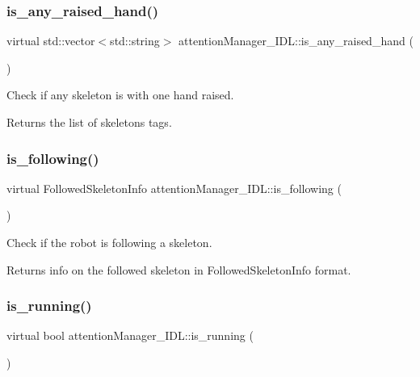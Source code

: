 \subsubsection{\texorpdfstring{is\+\_\+any\+\_\+raised\+\_\+hand()}{is\_any\_raised\_hand()}}
{\footnotesize\ttfamily virtual std\+::vector$<$std\+::string$>$ attention\+Manager\+\_\+\+I\+D\+L\+::is\+\_\+any\+\_\+raised\+\_\+hand (\begin{DoxyParamCaption}{ }\end{DoxyParamCaption})\hspace{0.3cm}{\ttfamily [virtual]}}



Check if any skeleton is with one hand raised. 

\begin{DoxyReturn}{Returns}
the list of skeletons\textquotesingle{} tags. 
\end{DoxyReturn}
\mbox{\label{classattentionManager__IDL_a03b844a8bd3d6e2b4cf5ba88ace27429}} 
\subsubsection{\texorpdfstring{is\+\_\+following()}{is\_following()}}
{\footnotesize\ttfamily virtual Followed\+Skeleton\+Info attention\+Manager\+\_\+\+I\+D\+L\+::is\+\_\+following (\begin{DoxyParamCaption}{ }\end{DoxyParamCaption})\hspace{0.3cm}{\ttfamily [virtual]}}



Check if the robot is following a skeleton. 

\begin{DoxyReturn}{Returns}
info on the followed skeleton in Followed\+Skeleton\+Info format. 
\end{DoxyReturn}
\mbox{\label{classattentionManager__IDL_ada750e5a7c6a0bb99be495e24d34dcdd}} 
\subsubsection{\texorpdfstring{is\+\_\+running()}{is\_running()}}
{\footnotesize\ttfamily virtual bool attention\+Manager\+\_\+\+I\+D\+L\+::is\+\_\+running (\begin{DoxyParamCaption}{ }\end{DoxyParamCaption})\hspace{0.3cm}{\ttfamily [virtual]}}



